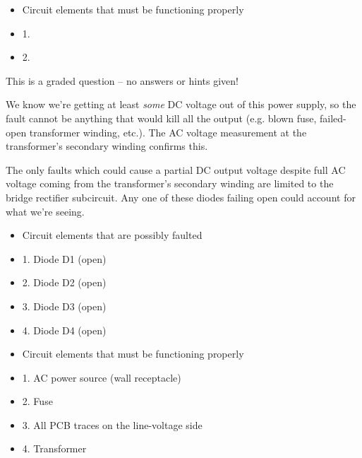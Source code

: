 \begin{itemize}
\goodbreak
\item{} Circuit elements that must be functioning properly
\item{1.} 
\item{2.} 
\end{itemize}

\vfil 

\eject






This is a graded question -- no answers or hints given!







We know we're getting at least {\it some} DC voltage out of this power supply, so the fault cannot be anything that would kill all the output (e.g. blown fuse, failed-open transformer winding, etc.).  The AC voltage measurement at the transformer's secondary winding confirms this.

The only faults which could cause a partial DC output voltage despite full AC voltage coming from the transformer's secondary winding are limited to the bridge rectifier subcircuit.  Any one of these diodes failing open could account for what we're seeing.

\begin{itemize}
\goodbreak
\item{} Circuit elements that are possibly faulted
\item{1.} Diode D1 (open)
\item{2.} Diode D2 (open)
\item{3.} Diode D3 (open)
\item{4.} Diode D4 (open)
\end{itemize}

\begin{itemize}
\goodbreak
\item{} Circuit elements that must be functioning properly
\item{1.} AC power source (wall receptacle)
\item{2.} Fuse
\item{3.} All PCB traces on the line-voltage side
\item{4.} Transformer
\end{itemize}




